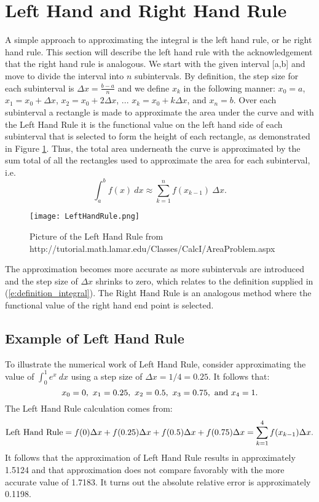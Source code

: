 \documentclass[twoside]{article}
\def\ds{\displaystyle}
\begin{document}
\section{Left Hand and Right Hand Rule}
A simple approach to approximating the integral is the left hand rule, or he right hand rule. This section will describe the left hand rule with the acknowledgement that the right hand rule is analogous. We start with the given interval [a,b] and move to divide the interval into $n$ subintervals. By definition, the step size for each subinterval is $\ds \Delta x = \frac {b-a}n$ and we define $\ds x_k$ in the following manner: $\ds x_0 = a$, $\ds x_1 = x_0 + \Delta x$, $\ds x_2 = x_0 + 2 \Delta x$, ... $\ds x_k = x_0 + k \Delta x$, and $\ds x_n = b$. Over each subinterval a rectangle is made to approximate the area under the curve and with the Left Hand Rule it is the functional value on the left hand side of each subinterval that is selected to form the height of each rectangle, as demonstrated in Figure \ref{f:LeftHandRule}. Thus, the total area underneath the curve is approximated by the sum total of all the rectangles used to approximate the area for each subinterval, i.e. 
$$\int_a^b f(x) \ dx \approx \sum_{k=1}^n f(x_{k-1}) \ \Delta x.$$

\begin{figure}[ht]
\centering
\texttt{[image: LeftHandRule.png]}
 \caption{Picture of the Left Hand Rule from http://tutorial.math.lamar.edu/Classes/CalcI/AreaProblem.aspx}
 \label{f:LeftHandRule}
\end{figure}
The approximation becomes more accurate as more subintervals are introduced and the step size of $\ds \Delta x$ shrinks to zero, which relates to the definition supplied in (\ref{e:definition_integral}). The Right Hand Rule is an analogous method where the functional value of the right hand end point is selected.
\subsection{Example of Left Hand Rule}
To illustrate the numerical work of Left Hand Rule, consider approximating the value of $\ds \int_0^1 e^x \ dx$ using a step size of $\Delta x = 1/4 = 0.25$. It follows that:
$$x_0 = 0, \ x_1 = 0.25, \ x_2 = 0.5, \ x_3=0.75, \ {\rm and} \ x_4=1.$$
The Left Hand Rule calculation comes from:
$${\rm Left \ Hand \ Rule}= f(0)\Delta x + f(0.25) \Delta x + f(0.5) \Delta x + f(0.75) \Delta x = \sum_{k=1}^4 f(x_{k-1})\Delta x.$$
It follows that the approximation of Left Hand Rule results in approximately 1.5124 and that approximation does not compare favorably with the more accurate value of 1.7183. It turns out the absolute relative error is approximately 0.1198. 
\end{document}
